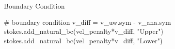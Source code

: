 \documentclass[10pt,aspectratio=169]{beamer}
\begin{document}
\begin{frame}[fragile]{Boundary Condition}
	\begin{python}
		# boundary condition
		v_diff =  v_uw.sym - v_ana.sym
		stokes.add_natural_bc(vel_penalty*v_diff, "Upper")
		stokes.add_natural_bc(vel_penalty*v_diff, "Lower")
	\end{python}
\end{frame}

\end{document}
